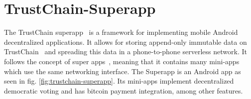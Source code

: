 \section{TrustChain-Superapp}
\label{sec:sote-trustchain}
The TrustChain superapp~\citep{mattskala2020} is a framework for implementing mobile Android decentralized applications. It allows for storing append-only immutable data on TrustChain~\citep{otte2017trustchain} and spreading this data in a phone-to-phone serverless network. It follows the concept of super apps~\citep{kpmg2019superapps}, meaning that it contains many mini-apps which use the same networking interface. The Superapp is an Android app as seen in fig. \ref{fig:trustchain-superapp}. Its mini-apps implement decentralized democratic voting and has bitcoin payment integration, among other features.

